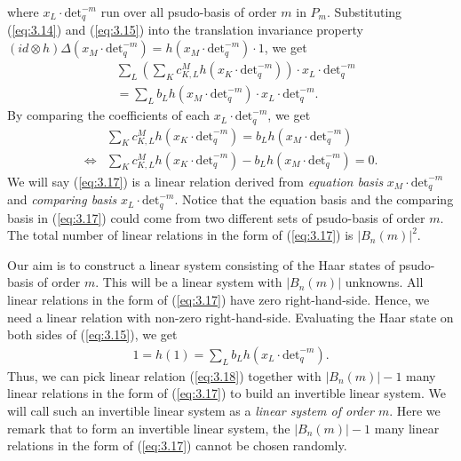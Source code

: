 \documentclass[table,a4paper,reqno]{amsart}
\numberwithin{equation}{section}
\theoremstyle{definition}
\begin{document}
where $x_L\cdot\text{det}_q^{-m}$ run over all psudo-basis of order $m$ in $P_m$. Substituting (\ref{eq:3.14}) and (\ref{eq:3.15}) into the translation invariance property $(id\otimes h)\Delta(x_M\cdot\text{det}_q^{-m})=h(x_M\cdot\text{det}_q^{-m})\cdot 1$, we get
\begin{equation}\label{eq:3.16}
    \begin{split}   &\sum_{L}\left(\sum_{K}c^M_{K,L}h(x_K\cdot\text{det}_q^{-m})\right)\cdot x_L\cdot\text{det}_q^{-m}\\
    &=\sum_L b_Lh(x_M\cdot\text{det}_q^{-m})\cdot x_L\cdot \text{det}_q^{-m}.
    \end{split}
\end{equation}
By comparing the coefficients of each $x_L\cdot \text{det}_q^{-m}$, we get
\begin{equation}\label{eq:3.17}
\begin{split}
    &\sum_{K}c^M_{K,L}h(x_K\cdot\text{det}_q^{-m})=b_Lh(x_M\cdot\text{det}_q^{-m})\\
    \Longleftrightarrow&\sum_{K}c^M_{K,L}h(x_K\cdot\text{det}_q^{-m})-b_Lh(x_M\cdot\text{det}_q^{-m})=0.
\end{split}
\end{equation}
We will say (\ref{eq:3.17}) is a linear relation derived from \textit{equation basis} $x_M\cdot\text{det}_q^{-m}$ and \textit{comparing basis} $x_L\cdot \text{det}_q^{-m}$. Notice that the equation basis and the comparing basis in (\ref{eq:3.17}) could come from two different sets of psudo-basis of order $m$. The total number of linear relations in the form of (\ref{eq:3.17}) is $|B_n(m)|^2$.

Our aim is to construct a linear system consisting of the Haar states of psudo-basis of order $m$. This will be a linear system with $|B_n(m)|$ unknowns. All linear relations in the form of (\ref{eq:3.17}) have zero right-hand-side. Hence, we need a linear relation with non-zero right-hand-side. Evaluating the Haar state on both sides of (\ref{eq:3.15}), we get
\begin{align}\label{eq:3.18}
    1=h(1)=\sum_L b_Lh(x_L\cdot \text{det}_q^{-m}).
\end{align}
Thus, we can pick linear relation (\ref{eq:3.18}) together with $|B_n(m)|-1$ many linear relations in the form of (\ref{eq:3.17}) to build an invertible linear system. We will call such an invertible linear system as a \textit{linear system of order $m$}. Here we remark that to form an invertible linear system, the $|B_n(m)|-1$ many linear relations in the form of (\ref{eq:3.17}) cannot be chosen randomly. 
\end{document}
